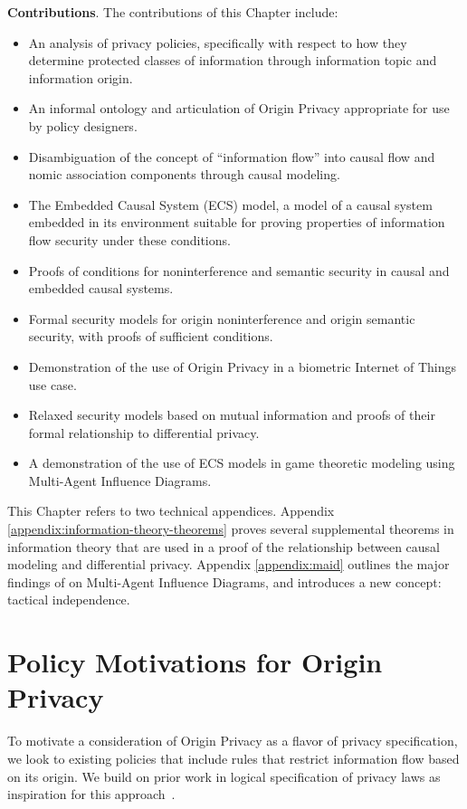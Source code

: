 \documentclass[../thesis.tex]{subfiles}
\begin{document}
\textbf{Contributions}. The contributions of this Chapter
include:
\begin{itemize}
\item An analysis of privacy policies, specifically with
  respect to how they determine protected classes of information
  through information topic and information origin.
\item An informal ontology and articulation of Origin Privacy
  appropriate for use by policy designers.
\item Disambiguation of the concept of ``information flow''
  into causal flow and nomic association components through
  causal modeling.
\item The Embedded Causal System (ECS) model, a model of a
  causal system embedded in its environment suitable for
  proving properties of information flow security under these
  conditions.
\item Proofs of conditions for noninterference and semantic security
  in causal and embedded causal systems.
\item Formal security models for origin noninterference and origin
  semantic security, with proofs of sufficient conditions.
\item Demonstration of the use of Origin Privacy in a
  biometric Internet of Things use case.
\item Relaxed security models based on mutual information and
  proofs of their formal relationship to differential privacy.
\item A demonstration of the use of ECS models in game theoretic
  modeling using Multi-Agent Influence Diagrams.
\end{itemize}

This Chapter refers to two technical appendices.
Appendix \ref{appendix:information-theory-theorems}
proves several supplemental theorems in information theory
that are used in a proof of the relationship between
causal modeling and differential privacy.
Appendix \ref{appendix:maid} outlines the major
findings of \citet{koller2003multi} on Multi-Agent
Influence Diagrams, and introduces a new concept:
tactical independence.

\section{Policy Motivations for Origin Privacy}
\label{sec:policy}

To motivate a consideration of Origin Privacy as a flavor
of privacy specification, we look to existing policies that
include rules that restrict information flow based on its origin.
We build on prior work in logical specification of privacy
laws as inspiration for this 
approach~\cite{barth06sp,DeYoungGJKD10}.
\end{document}
